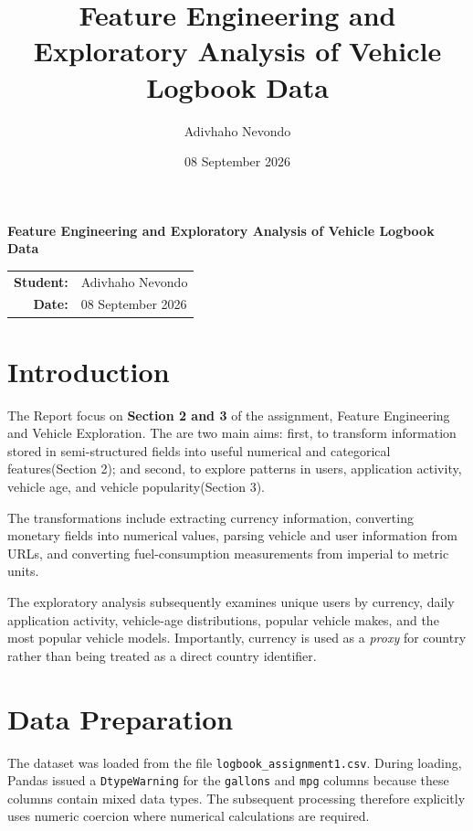 \documentclass[12pt,a4paper]{article}
\title{\textbf{Feature Engineering and Exploratory Analysis of Vehicle Logbook Data}}
\author{Adivhaho Nevondo}
\date{08 September 2026}
\begin{document}
\begin{titlepage}
    \centering
    \vspace*{2cm}
    {\Large\textbf{Feature Engineering and Exploratory Analysis of Vehicle Logbook Data}\par}
    \vspace{1.5cm}
    \vspace{2cm}
    \begin{tabular}{rl}
        \textbf{Student:} & Adivhaho Nevondo \\
        \textbf{Date:} & 08 September 2026 \\
    \end{tabular}
    \vfill
    \vspace{0.5cm}
\end{titlepage}

\tableofcontents
\newpage

\section{Introduction}

The Report focus on \textbf{Section 2 and 3} of the assignment, Feature Engineering and Vehicle Exploration. The are two main aims: first, to transform information stored in semi-structured fields into useful numerical and categorical features(Section 2); and second, to explore patterns in users, application activity, vehicle age, and vehicle popularity(Section 3).

The transformations include extracting currency information, converting monetary fields into numerical values, parsing vehicle and user information from URLs, and converting fuel-consumption measurements from imperial to metric units.

The exploratory analysis subsequently examines unique users by currency, daily application activity, vehicle-age distributions, popular vehicle makes, and the most popular vehicle models. Importantly, currency is used as a \emph{proxy} for country rather than being treated as a direct country identifier. \cite{notebook}

\section{Data Preparation}

The dataset was loaded from the file \texttt{logbook\_assignment1.csv}. During loading, Pandas issued a \texttt{DtypeWarning} for the \texttt{gallons} and \texttt{mpg} columns because these columns contain mixed data types. The subsequent processing therefore explicitly uses numeric coercion where numerical calculations are required. \cite{notebook}
\end{document}
